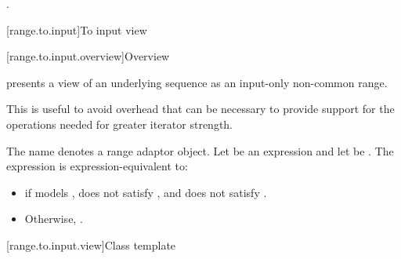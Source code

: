 \begin{itemdescr}
\pnum
\returns
{}.
\end{itemdescr}

[range.to.input]{To input view}

[range.to.input.overview]{Overview}

\pnum
{} presents a view of an underlying sequence
as an input-only non-common range.
\begin{note}
This is useful to avoid overhead
that can be necessary to provide support for the operations
needed for greater iterator strength.
\end{note}

\pnum
The name  denotes
a range adaptor object.
Let  be an expression and let  be .
The expression  is expression-equivalent to:
\begin{itemize}
\item
{}
if  models ,
does not satisfy , and
does not satisfy .
\item
Otherwise, .
\end{itemize}

[range.to.input.view]{Class template }

